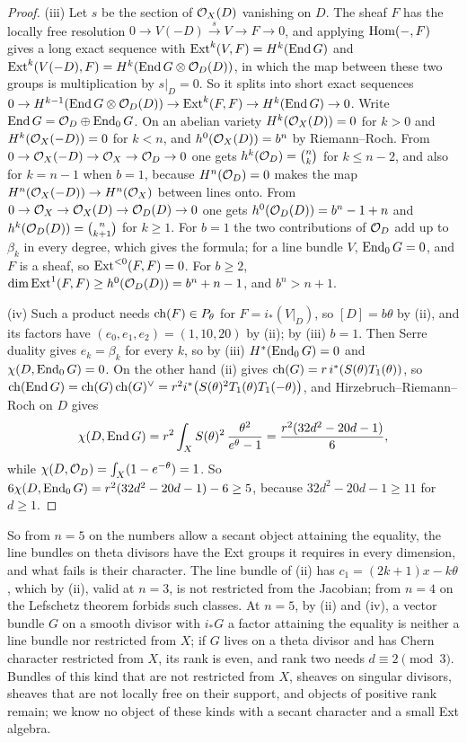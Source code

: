 \begin{proof}
(iii) Let $s$ be the section of $\mathcal{O}_{X}(D)$ vanishing on $D$. The sheaf $F$
has the locally free resolution $0\to V(-D)\xrightarrow{s}V\to F\to0$, and
applying $\operatorname{Hom}(-,F)$ gives a long exact sequence with
$\operatorname{Ext}^{k}(V,F)=H^{k}(\operatorname{End} G)$ and $\operatorname{Ext}^{k}(V(-D),F)=H^{k}(\operatorname{End} G\otimes
\mathcal{O}_{D}(D))$, in which the map between these two groups is multiplication by
$s|_{D}=0$. So it splits into short exact sequences
$0\to H^{k-1}(\operatorname{End} G\otimes\mathcal{O}_{D}(D))\to\operatorname{Ext}^{k}(F,F)\to H^{k}(\operatorname{End} G)\to0$.
Write $\operatorname{End} G=\mathcal{O}_{D}\oplus\operatorname{End}_{0}G$. On an abelian variety $H^{k}(\mathcal{O}_{X}(D))=0$
for $k>0$ and $H^{k}(\mathcal{O}_{X}(-D))=0$ for $k<n$, and $h^{0}(\mathcal{O}_{X}(D))=b^{n}$
by Riemann--Roch. From $0\to\mathcal{O}_{X}(-D)\to\mathcal{O}_{X}\to\mathcal{O}_{D}\to0$ one gets
$h^{k}(\mathcal{O}_{D})=\binom nk$ for $k\le n-2$, and also for $k=n-1$ when $b=1$,
because $H^{n}(\mathcal{O}_{D})=0$ makes the map $H^{n}(\mathcal{O}_{X}(-D))\to H^{n}(\mathcal{O}_{X})$
between lines onto. From $0\to\mathcal{O}_{X}\to\mathcal{O}_{X}(D)\to\mathcal{O}_{D}(D)\to0$ one gets
$h^{0}(\mathcal{O}_{D}(D))=b^{n}-1+n$ and $h^{k}(\mathcal{O}_{D}(D))=\binom{n}{k+1}$ for $k\ge1$.
For $b=1$ the two contributions of $\mathcal{O}_{D}$ add up to $\beta_{k}$ in every
degree, which gives the formula; for a line bundle $V$, $\operatorname{End}_{0}G=0$, and
$F$ is a sheaf, so $\operatorname{Ext}^{<0}(F,F)=0$. For $b\ge2$,
$\dim\operatorname{Ext}^{1}(F,F)\ge h^{0}(\mathcal{O}_{D}(D))=b^{n}+n-1$, and $b^{n}>n+1$.

(iv) Such a product needs $\operatorname{ch}(F)\in P_{\theta}$ for $F=i_{*}(V|_{D})$, so
$[D]=b\theta$ by (ii), and its factors have
$(e_{0},e_{1},e_{2})=(1,10,20)$ by (ii); by (iii)
$b=1$. Then Serre duality gives $e_{k}=\beta_{k}$ for every $k$, so by (iii)
$H^{*}(\operatorname{End}_{0}G)=0$ and $\chi(D,\operatorname{End}_{0}G)=0$. On the other hand (ii) gives
$\operatorname{ch}(G)=r\,i^{*}(S(\theta)T_{1}(\theta))$, so
$\operatorname{ch}(\operatorname{End} G)=\operatorname{ch}(G)\operatorname{ch}(G)^{\vee}=r^{2}i^{*}\bigl(S(\theta)^{2}T_{1}(\theta)
T_{1}(-\theta)\bigr)$, and Hirzebruch--Riemann--Roch on $D$ gives
\[
  \chi(D,\operatorname{End} G)=r^{2}\int_{X}S(\theta)^{2}\,\frac{\theta^{2}}{e^{\theta}-1}
  =\frac{r^{2}(32d^{2}-20d-1)}{6},
\]
while $\chi(D,\mathcal{O}_{D})=\int_{X}(1-e^{-\theta})=1$.
So $6\chi(D,\operatorname{End}_{0}G)=r^{2}(32d^{2}-20d-1)-6\ge5$, because
$32d^{2}-20d-1\ge11$ for $d\ge1$.
\end{proof}

So from $n=5$ on the numbers allow a secant object attaining the equality, the
line bundles on theta divisors have the Ext groups it requires in every
dimension, and what fails is their character. The line bundle of
(ii) has $c_{1}=(2k+1)x-k\theta$, which by
(ii), valid at $n=3$, is not restricted from the
Jacobian; from $n=4$ on the Lefschetz theorem forbids such classes. At $n=5$,
by (ii) and (iv), a vector bundle $G$ on a smooth divisor with $i_{*}G$ a
factor attaining the equality is neither a line bundle nor restricted from
$X$; if $G$ lives on a theta divisor and has Chern character restricted from
$X$, its rank is even, and rank two needs $d\equiv2\pmod3$. Bundles of this kind that are not restricted from
$X$, sheaves on singular divisors, sheaves that are not locally free on their
support, and objects of positive rank remain; we know no object of these kinds
with a secant character and a small Ext algebra.

